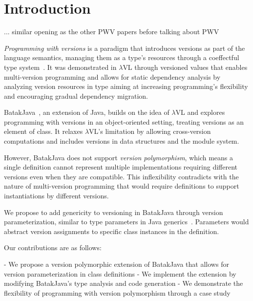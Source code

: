 \section{Introduction}

... similar opening as the other PWV papers before talking about PWV

\emph{Programming with versions} is a paradigm that introduces versions as part of the language semantics, managing them as a type's resources through a coeffectful type system~\cite{tanabe2021functional}. It was demonstrated in $\lambda$VL through versioned values that enables multi-version programming and allows for static dependency analysis by analyzing version resources in type aiming at increasing programming's flexibility and encouraging gradual dependency migration.

BatakJava~\cite{?}, an extension of Java, builds on the idea of $\lambda$VL and explores programming with versions in an object-oriented setting, treating versions as an element of class. It relaxes $\lambda$VL's limitation by allowing cross-version computations and includes versions in data structures and the module system.

However, BatakJava does not support \emph{version polymorphism}, which means a single definition cannot represent multiple implementations requiring different versions even when they are compatible. This inflexibility contradicts with the nature of multi-version programming that would require definitions to support instantiations by different versions.

We propose to add genericity to versioning in BatakJava through version parameterization, similar to type parameters in Java generics~\cite{}. Parameters would abstract version assignments to specific class instances in the definition.

Our contributions are as follows:

- We propose a version polymorphic extension of BatakJava that allows for version parameterization in class definitions
- We implement the extension by modifying BatakJava's type analysis and code generation
- We demonstrate the flexibility of programming with version polymorphism through a case study
